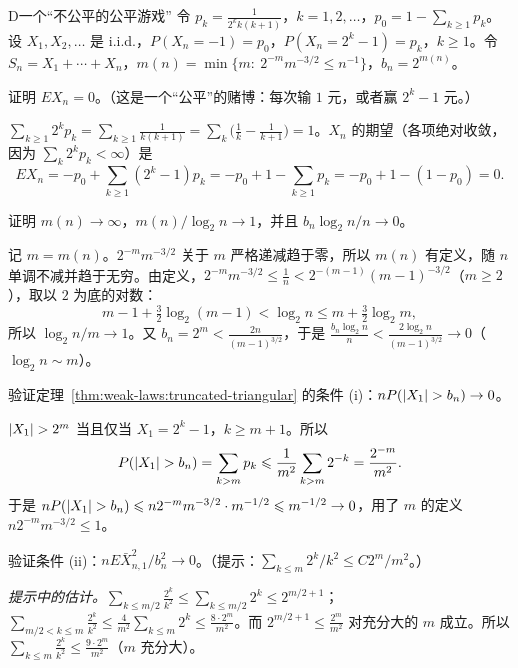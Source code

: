 \begin{probleme}[问题]{D}{一个“不公平的公平游戏”}
令 $p_k=\frac1{2^kk(k+1)}$，$k=1,2,\dots$，$p_0=1-\sum_{k\geqslant1}p_k$。设 $X_1,X_2,\dots$ 是 i.i.d.，$P(X_n=-1)=p_0$，$P(X_n=2^k-1)=p_k$，$k\geqslant1$。令 $S_n=X_1+\cdots+X_n$，$m(n)=\min\{m:\ 2^{-m}m^{-3/2}\leqslant n^{-1}\}$，$b_n=2^{m(n)}$。
\begin{questions}
\item 证明 $EX_n=0$。（这是一个“公平”的赌博：每次输 $1$ 元，或者赢 $2^k-1$ 元。）
\begin{solution}
$\sum_{k\geqslant1}2^kp_k=\sum_{k\geqslant1}\frac1{k(k+1)}=\sum_k\bigl(\frac1k-\frac1{k+1}\bigr)=1$。$X_n$ 的期望（各项绝对收敛，因为 $\sum_k2^kp_k<\infty$）是
\[
EX_n=-p_0+\sum_{k\geqslant1}(2^k-1)p_k=-p_0+1-\sum_{k\geqslant1}p_k=-p_0+1-(1-p_0)=0 .
\]
\end{solution}
\item 证明 $m(n)\to\infty$，$m(n)/\log_2n\to1$，并且 $b_n\log_2n/n\to0$。
\begin{solution}
记 $m=m(n)$。$2^{-m}m^{-3/2}$ 关于 $m$ 严格递减趋于零，所以 $m(n)$ 有定义，随 $n$ 单调不减并趋于无穷。由定义，$2^{-m}m^{-3/2}\leqslant\frac1n<2^{-(m-1)}(m-1)^{-3/2}$（$m\geqslant2$），取以 $2$ 为底的对数：
\[
m-1+\tfrac32\log_2(m-1)<\log_2n\leqslant m+\tfrac32\log_2m,
\]
所以 $\log_2n/m\to1$。又 $b_n=2^m<\frac{2n}{(m-1)^{3/2}}$，于是 $\frac{b_n\log_2n}n<\frac{2\log_2n}{(m-1)^{3/2}}\to0$（$\log_2n\sim m$）。
\end{solution}
\item 验证定理~\ref{thm:weak-laws:truncated-triangular} 的条件 (i)：$nP(\lvert X_1\rvert>b_n)\to0$。
\begin{solution}
$\lvert X_1\rvert>2^m$ 当且仅当 $X_1=2^k-1$，$k\geqslant m+1$。所以
\[
P(\lvert X_1\rvert>b_n)=\sum_{k>m}p_k\leqslant\frac1{m^2}\sum_{k>m}2^{-k}=\frac{2^{-m}}{m^2}.
\]
于是 $nP(\lvert X_1\rvert>b_n)\leqslant n2^{-m}m^{-3/2}\cdot m^{-1/2}\leqslant m^{-1/2}\to0$，用了 $m$ 的定义 $n2^{-m}m^{-3/2}\leqslant1$。
\end{solution}
\item 验证条件 (ii)：$nE\bar X_{n,1}^2/b_n^2\to0$。（提示：$\sum_{k\leqslant m}2^k/k^2\leqslant C2^m/m^2$。）
\begin{solution}
\emph{提示中的估计。}$\sum_{k\leqslant m/2}\frac{2^k}{k^2}\leqslant\sum_{k\leqslant m/2}2^k\leqslant2^{m/2+1}$；$\sum_{m/2<k\leqslant m}\frac{2^k}{k^2}\leqslant\frac4{m^2}\sum_{k\leqslant m}2^k\leqslant\frac{8\cdot2^m}{m^2}$。而 $2^{m/2+1}\leqslant\frac{2^m}{m^2}$ 对充分大的 $m$ 成立。所以 $\sum_{k\leqslant m}\frac{2^k}{k^2}\leqslant\frac{9\cdot2^m}{m^2}$（$m$ 充分大）。


\end{solution}
\end{questions}
\end{probleme}
